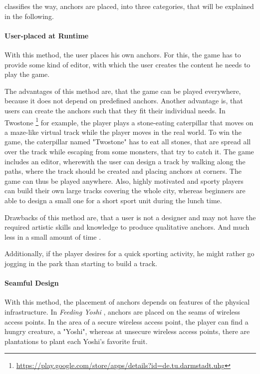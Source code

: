 \citeauthor{reid2008design} classifies the way, anchors are placed, into three categories, that will be explained in the following.

\paragraph{User-placed at Runtime}
With this method, the user places his own anchors. For this, the game has to provide some kind of editor, with which the user creates the content he needs to play the game.

The advantages of this method are, that the game can be played everywhere, because it does not depend on predefined anchors. Another advantage is, that users can create the anchors such that they fit their individual needs. In Twostone \footnote{\url{https://play.google.com/store/apps/details?id=de.tu.darmstadt.uhg}} for example, the player plays a stone-eating caterpillar that moves on a maze-like virtual track while the player moves in the real world. To win the game, the caterpillar named "Twostone" has to eat all stones, that are spread all over the track while escaping from some monsters, that try to catch it. The game includes an editor, wherewith the user can design a track by walking along the paths, where the track should be created and placing anchors at corners. The game can thus be played anywhere. Also, highly motivated and sporty players can build their own large tracks covering the whole city, whereas beginners are able to design a small one for a short sport unit during the lunch time.

Drawbacks of this method are, that a user is not a designer and may not have the required artistic skills and knowledge to produce qualitative anchors. And much less in a small amount of time \citep{carraca2014procedural}.

Additionally, if the player desires for a quick sporting activity, he might rather go jogging in the park than starting to build a track.

\paragraph{Seamful Design}
With this method, the placement of anchors depends on features of the physical infrastructure. In \emph{Feeding Yoshi} \citep{reid2008design}, anchors are placed on the seams of wireless access points. In the area of a secure wireless access point, the player can find a hungry creature, a "Yoshi", whereas at unsecure wireless access points, there are plantations to plant each Yoshi's favorite fruit.

